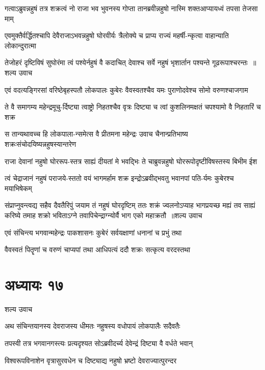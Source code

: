 \twolineshloka
{गत्वाऽब्रुवन्नहुषं तत्र शक्रत्वं नो राजा भव भुवनस्य गोप्ता}
{तानब्रवीन्नहुषो नास्मि शक्तआप्यायध्वं तपसा तेजसा माम्}


\twolineshloka
{एवमुक्तैर्वर्द्धितश्चापि देवैराजाऽभवन्नहुषो घोरवीर्यः}
{त्रैलोक्ये च प्राप्य राज्यं महर्षी-न्कृत्वा वाहान्याति लोकान्दुरात्मा}


\threelineshloka
{तेजोहरं दृष्टिविषं सुघोरंमा त्वं पश्येर्नहुषं वै कदाचित्}
{देवाश्च सर्वे नहुषं भृशार्तान पश्यन्ते गूढरूपाश्चरन्तः ॥शल्य उवाच}
{}


\twolineshloka
{एवं वदत्यङ्गिरसां वरिष्ठेबृहस्पतौ लोकपालः कुबेरः}
{वैवस्वतश्चैव यमः पुराणोदवेश्च सोमो वरुणश्चाजगाम}


\twolineshloka
{ते वै समागम्य महेन्द्रमूचु-र्दिष्ट्या त्वाष्ट्रो निहतश्चैव वृत्रः}
{दिष्ट्या च त्वां कुशलिनमक्षतं चपश्यामो वै निहतारिं च शक्र}


\twolineshloka
{स तान्यथावच्च हि लोकपाला-न्समेत्स वै प्रीतमना महेन्द्रः}
{उवाच चैनान्प्रतिभाष्य शक्रःसंचोदयिष्यन्नहुषस्यान्तरेण}


\twolineshloka
{राजा देवानां नहुषो घोररूप-स्तत्र साह्यं दीयतां मे भवद्भिः}
{ते चाब्रुवन्नहुषो घोररूपोदृष्टीविषस्तस्य बिभीम ईश}


\twolineshloka
{त्वं चेद्राजानं नहुषं पराजये-स्ततो वयं भागमर्हाम शक्र}
{इन्द्रोऽब्रवीद्भवतु भवानपां पति-र्यमः कुबेरश्च मयाभिषेकम्}


\fourlineindentedshloka
{संप्राप्नुवन्त्वद्य सहैव दैवतैरिपुं जयाम तं नहुषं घोरदृष्टिम्}
{ततः शक्रं ज्वलनोऽप्याह भागप्रयच्छ मह्यं तव साह्यं करिष्ये}
{तमाह शक्रो भविताऽग्ने तवापिचेन्द्राग्न्योर्वै भाग एको महाक्रतौ ॥शल्य उवाच}
{}


\twolineshloka
{एवं संचिन्त्य भगवान्महेन्द्रः पाकशासनः}
{कुबेरं सर्वयक्षाणां धनानां च प्रभुं तथा}


\twolineshloka
{वैवस्वतं पितॄणां च वरुणं चाप्यपां तथा}
{आधिपत्यं ददौ शक्रः सत्कृत्य वरदस्तथा}


\chapter{अध्यायः १७}
\twolineshloka
{शल्य उवाच}
{}


\twolineshloka
{अथ संचिन्तयानस्य देवराजस्य धीमतः}
{नहुषस्य वधोपायं लोकपालैः सदैवतैः}


\twolineshloka
{तपस्वी तत्र भगवानगस्त्यः प्रत्यदृश्यत}
{सोऽब्रवीदर्च्य देवेन्द्रं दिष्ट्या वै वर्धते भवान्}


\twolineshloka
{विश्वरूपविनाशेन वृत्रासुरवधेन च}
{दिष्ट्याद्य नहुषो भ्रष्टो देवराज्यात्पुरन्दर}


